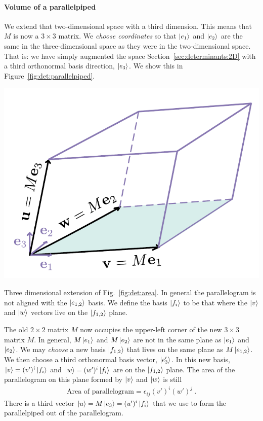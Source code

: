 \paragraph{Volume of a parallelpiped}
We extend that two-dimensional space with a third dimension. This means that $M$ is now a $3\times 3$ matrix. We \emph{choose coordinates} so that $\left|e_1\right\rangle$ and $\left|e_2\right\rangle$ are the same in the three-dimensional space as they were in the two-dimensional space. That is: we have simply augmented the space Section~\ref{sec:determinants:2D} with a third orthonormal basis direction, $\left|e_3\right\rangle$. We show this in Figure~\ref{fig:det:parallelpiped}. 
\begin{marginfigure}%
    \includegraphics[width=\textwidth]{figures/det Parallelpiped.pdf}
    \caption{Three dimensional extension of Fig.~\ref{fig:det:area}. In general the parallelogram is not aligned with the $\left|e_{1,2}\right\rangle$ basis. We define the basis $\left|f_i\right\rangle$ to be that where the $\left|v\right\rangle$ and $\left|w\right\rangle$ vectors live on the $\left|f_{1,2}\right\rangle$ plane.}
    \label{fig:det:parallelpiped}
\end{marginfigure}

The old $2\times 2$ matrix $M$ now occupies the upper-left corner of the new $3\times 3$ matrix $M$. In general, $M\left|e_1\right\rangle$  and $M\left|e_2\right\rangle$ are not in the same plane as $\left|e_{1}\right\rangle$ and $\left|e_2\right\rangle$. We may \emph{choose} a new basis $\left|f_{1,2}\right\rangle$ that lives on the same plane as $M\left|e_{1,2}\right\rangle$.  We then choose a third orthonormal basis vector, $\left|e'_3\right\rangle$. In this new basis, $\left|v\right\rangle = (v')^i\left|f_i\right\rangle$ and $\left|w\right\rangle=(w')^i\left|f_i\right\rangle$ are on the $\left|f_{1,2}\right\rangle$ plane. The area of the parallelogram on this plane formed by $\left|v\right\rangle$ and $\left|w\right\rangle$ is still
\begin{align}
    \text{Area of parallelogram} = \epsilon_{ij}(v')^i(w')^j \ .
\end{align}
There is a third vector $\left|u\right\rangle = M\left|e_3\right\rangle = (u')^i \left|f_i\right\rangle$ that we use to form the parallelpiped out of the parallelogram. 

